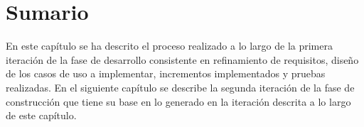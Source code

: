 \section{Sumario}

En este capítulo se ha descrito el proceso realizado a lo largo de la primera iteración de la fase de desarrollo consistente en refinamiento de requisitos, diseño de los casos de uso a implementar, incrementos implementados y pruebas realizadas. En el siguiente capítulo se describe la segunda iteración de la fase de construcción que tiene su base en lo generado en la iteración descrita a lo largo de este capítulo.


